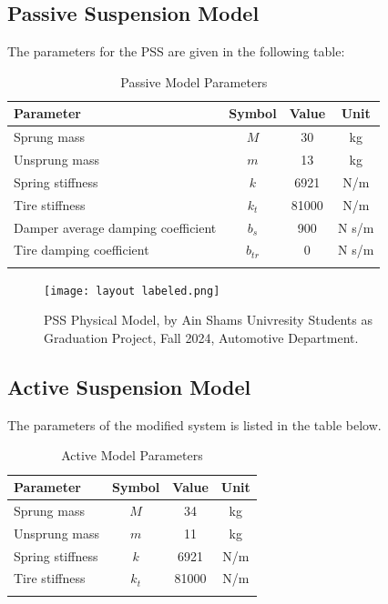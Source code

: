 \subsection{Passive Suspension Model}
The parameters for the PSS are given in the following table:

\begin{table}[h]
	\centering
	\caption{Passive Model Parameters}
	\begin{tabular}{lccc}
		
		\hline
		\textbf{Parameter} & \textbf{Symbol} & \textbf{Value}  & \textbf{Unit}  \\
		\hline
		
		Sprung mass & \( M\)& 30 & kg\\
		Unsprung mass & \( m \)& 13 & kg\\
		Spring stiffness & \( k \)& 6921 & N/m\\ 
		Tire stiffness & \( k_{t} \)& 81000 & N/m\\
		Damper average damping coefficient & \( b_{s} \)& 900 & N s/m\\
		Tire damping coefficient & \( b_{tr} \)& 0 & N s/m\\
		
		\hline
		\label{table:Parameter}
	\end{tabular}
\end{table}
\begin{figure}[H]
	\centering
	\texttt{[image: layout labeled.png]}
	\caption{PSS Physical Model, by Ain Shams Univresity Students as Graduation Project, Fall 2024, Automotive Department.}
	\label{fig:Passive layout}
\end{figure}

\newpage
\subsection{Active Suspension Model}
The parameters of the modified system is listed in the table below.

\begin{table}[h]
	\centering
	\caption{Active Model Parameters}
	\begin{tabular}{lccc}
		
		\hline
		\textbf{Parameter} & \textbf{Symbol} & \textbf{Value}  & \textbf{Unit}  \\
		\hline
		
		Sprung mass & \( M \)& 34 & kg\\
		Unsprung mass & \( m \)& 11 & kg\\
		Spring stiffness & \( k \)& 6921 & N/m\\ 
		Tire stiffness & \( k_{t} \)& 81000 & N/m\\
		\hline
		\label{table:Parameter}
	\end{tabular}
\end{table}

